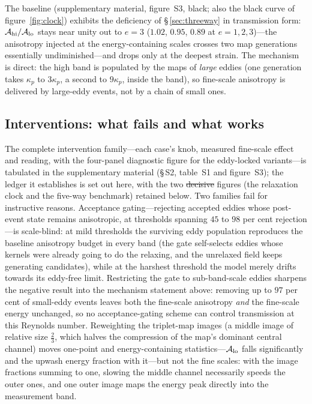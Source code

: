 \documentclass[lineno]{JFM-FLM_Au}
\providecommand{\DIFadd}[1]{{\protect\color{blue}\uwave{#1}}} %
\providecommand{\DIFdel}[1]{{\protect\color{red}\sout{#1}}} %
\providecommand{\DIFaddbegin}{} %
\providecommand{\DIFaddend}{} %
\providecommand{\DIFdelbegin}{} %
\providecommand{\DIFdelend}{} %
\begin{document}
The baseline (supplementary material, figure~S3, black; also the black
curve of figure~\ref{fig:clock}) exhibits the deficiency of
\S\,\ref{sec:threeway} in transmission form:
$\mathcal A_{\rm hi}/\mathcal A_{\rm lo}$ stays near unity out to $e=3$
($1.02$, $0.95$, $0.89$ at $e=1,2,3$)---the anisotropy injected at the
energy-containing scales crosses two map generations essentially
undiminished---and drops only at the deepest strain. The mechanism is
direct: the high band is populated by the maps of \emph{large} eddies
(one generation takes $\kappa_p$ to $3\kappa_p$, a second to $9\kappa_p$,
inside the band), so fine-scale anisotropy is delivered by large-eddy
events, not by a chain of small ones.

\subsection{Interventions: what fails and what works}\label{sec:interventions}

The complete intervention family---each case's knob, measured
fine-scale effect and reading, with the four-panel diagnostic figure
for the eddy-locked variants---is tabulated in the supplementary
material (\S\,S2, table~S1 and figure~S3); the ledger it establishes
is set out here, with the two \DIFdelbegin \DIFdel{decisive }\DIFdelend \DIFaddbegin \DIFadd{principal }\DIFaddend figures (the relaxation clock
and the five-way benchmark) retained below. Two
families fail for instructive reasons. Acceptance gating---rejecting
accepted eddies whose post-event state remains anisotropic, at thresholds
spanning $45$ to $98$ per cent rejection---is scale-blind: at mild
thresholds the surviving eddy population reproduces the baseline
anisotropy budget in every band (the gate self-selects eddies whose
kernels were already going to do the relaxing, and the unrelaxed field
keeps generating candidates), while at the harshest threshold the model
merely drifts towards its eddy-free limit. Restricting the gate to
sub-band-scale eddies sharpens the negative result into the mechanism
statement above: removing up to $97$ per cent of small-eddy events leaves
both the fine-scale anisotropy \emph{and} the fine-scale energy
unchanged, so no acceptance-gating scheme can control transmission at
this Reynolds number. Reweighting the triplet-map images (a middle image
of relative size $\tfrac23$, which halves the compression of the
map's dominant central channel) moves one-point and energy-containing
statistics---$\mathcal A_{\rm lo}$ falls significantly and the upwash
energy fraction with it---but not the fine scales: with the image
fractions summing to one, slowing the middle channel necessarily speeds
the outer ones, and one outer image maps the energy peak directly into
the measurement band.
\end{document}
